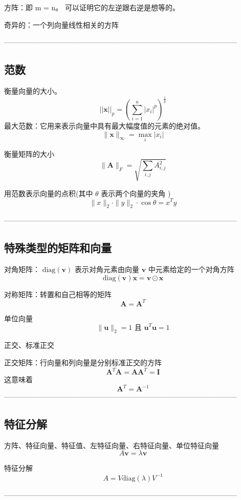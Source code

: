 \documentclass{article}
\begin{document}
方阵：即 m = n。 可以证明它的左逆跟右逆是想等的。

奇异的：一个列向量线性相关的方阵

--------------------------------------------------------------------------------------------------

\subsection{范数}
衡量向量的大小。
$$
||\mathbf{x}||_p = \left( \sum_{i=1}^n |x_i|^p \right)^{\frac{1}{p}}
$$
最大范数：它用来表示向量中具有最大幅度值的元素的绝对值。
$$
\| \boldsymbol{x} \|_{\infty} = \max_i | x_i |
$$

衡量矩阵的大小
\begin{equation}
    \| \mathbf{A} \|_F = \sqrt{\sum_{i,j} A_{i,j}^2}
\end{equation}

用范数表示向量的点积(其中 $\theta$ 表示两个向量的夹角 )
$$\|x\|_2 \cdot \|y\|_2 \cdot \cos \theta = x^T y$$

--------------------------------------------------------------------------------------------------
\subsection{特殊类型的矩阵和向量}
对角矩阵： $\text{diag}(\mathbf{v})$ 表示对角元素由向量 $\mathbf{v}$ 中元素给定的一个对角方阵
$$\text{diag}(\mathbf{v})\mathbf{x} = \mathbf{v} \odot \mathbf{x} $$

对称矩阵：转置和自己相等的矩阵
$$\mathbf{A} = \mathbf{A}^T$$

单位向量
$$\|\mathbf{u}\|_2 = 1 \text{ 且 } \mathbf{u}^T\mathbf{u}=1$$

正交、标准正交

正交矩阵：行向量和列向量是分别标准正交的方阵
$$
\boldsymbol{A}^T \boldsymbol{A} = \boldsymbol{A} \boldsymbol{A}^T = \boldsymbol{I}
$$
这意味着
$$
\boldsymbol{A}^T = \boldsymbol{A}^{-1}
$$
--------------------------------------------------------------------------------------------------
\subsection{特征分解}
方阵、特征向量、特征值、左特征向量、右特征向量、单位特征向量
$$A \mathbf{v} = \lambda \mathbf{v}$$

特征分解
$$A = V \text{diag}(\lambda) V^{-1}$$

--------------------------------------------------------------------------------------------------
\end{document}
